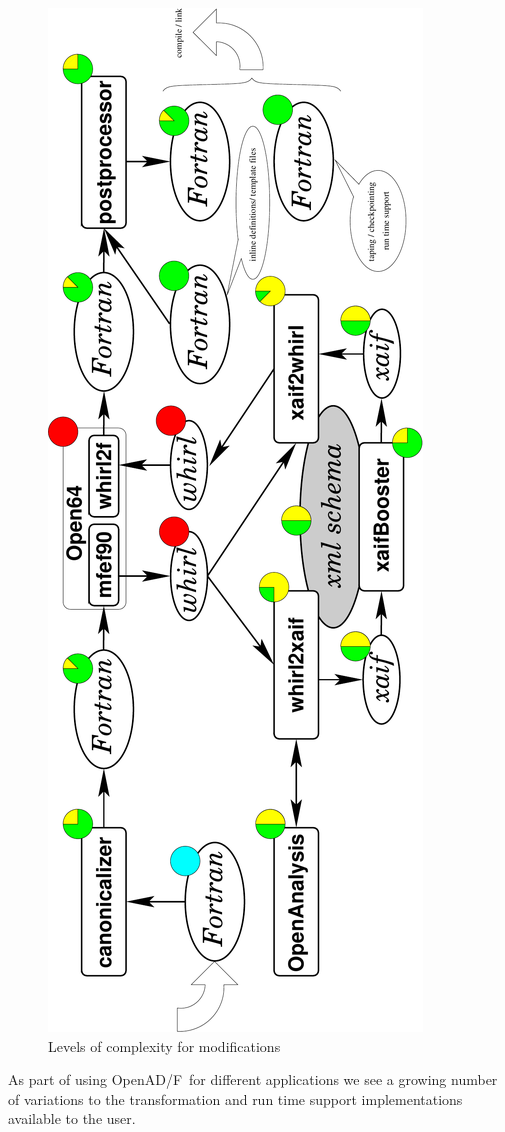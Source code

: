 \documentclass{book}
\newcommand{\OpenADF}{OpenAD/F}
\begin{document}
\begin{figure}
\begin{center}
\includegraphics[width=\textwidth]{overview2}
\end{center}
\caption{Levels of complexity for modifications}\label{fig:toolChainIntervention}
\end{figure} 
As part of using \OpenADF\ for different applications we see a growing number of 
variations to the  transformation and run time support implementations available 
to the user.
\end{document}
